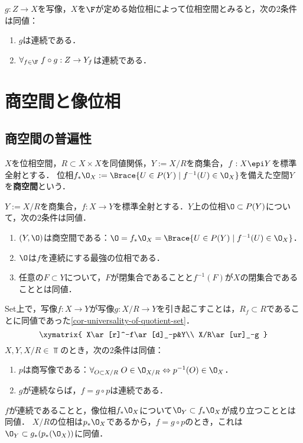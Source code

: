 \documentclass[uplatex,dvipdfmx]{jsreport}
\begin{document}
\begin{corollary}
    $g:Z\to X$を写像，$X$を$\F$が定める始位相によって位相空間とみると，次の2条件は同値：
    \begin{enumerate}
        \item $g$は連続である．
        \item $\forall_{f\in\F}\;f\circ g:Z\to Y_f$は連続である．
    \end{enumerate}
\end{corollary}

\section{商空間と像位相}

\subsection{商空間の普遍性}

\begin{definition}
    $X$を位相空間，$R\subset X\times X$を同値関係，$Y:=X/R$を商集合，$f:X\epi Y$を標準全射とする．
    位相$f_*\O_X:=\Brace{U\in P(Y)\mid f^{-1}(U)\in\O_X}$を備えた空間$Y$
    を\textbf{商空間}という．
\end{definition}

\begin{proposition}[商位相の特徴付け]
    $Y:=X/R$を商集合，$f:X\to Y$を標準全射とする．$Y$上の位相$\O\subset P(Y)$について，次の2条件は同値．
    \begin{enumerate}
        \item $(Y,\O)$は商空間である：$\O=f_*\O_X=\Brace{U\in P(Y)\mid f^{-1}(U)\in\O_X}$．
        \item $\O$は$f$を連続にする最強の位相である．
        \item 任意の$F\subset Y$について，$F$が閉集合であることと$f^{-1}(F)$が$X$の閉集合であることとは同値．
    \end{enumerate}
\end{proposition}

\begin{proposition}[商空間の普遍性]
    Set上で，写像$f:X\to Y$が写像$g:X/R\to Y$を引き起こすことは，$R_f\subset R$であることに同値であった\ref{cor-universality-of-quotient-set}．
    \[\xymatrix{
        X\ar[r]^-f\ar[d]_-p&Y\\
        X/R\ar[ur]_-g
    }\]
    $X,Y,X/R\in\Top$のとき，次の2条件は同値：
    \begin{enumerate}
        \item $p$は商写像である：$\forall_{O\subset X/R}\;O\in\O_{X/R}\Leftrightarrow p^{-1}(O)\in\O_X$．
        \item $g$が連続ならば，$f=g\circ p$は連続である．
    \end{enumerate}
\end{proposition}
\begin{Proof}
    $f$が連続であることと，像位相$f_*\O_X$について$\O_Y\subset f_*\O_X$が成り立つこととは同値．
    $X/R$の位相は$p_*\O_X$であるから，$f=g\circ p$のとき，これは$\O_Y\subset g_*(p_*(\O_X))$に同値．
\end{Proof}
\end{document}

